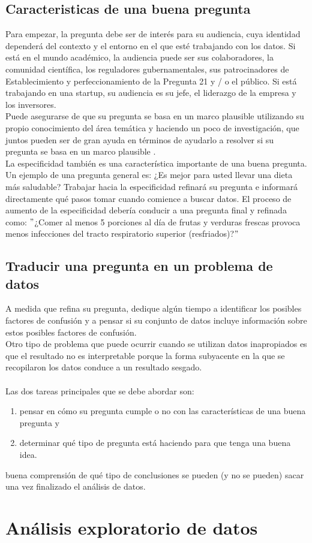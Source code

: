 \documentclass[10pt]{book}
\begin{document}
\section{Caracteristicas de una buena pregunta}
Para empezar, la pregunta debe ser de interés para su audiencia, cuya identidad dependerá del contexto y el entorno en el que esté trabajando con los datos. Si está en el mundo académico, la audiencia puede ser sus colaboradores, la comunidad científica, los reguladores gubernamentales, sus patrocinadores de Establecimiento y perfeccionamiento de la Pregunta 21 y / o el público. Si está trabajando en una startup, su audiencia es su jefe, el liderazgo de la empresa y los inversores.\\
Puede asegurarse de que su pregunta se basa en un marco plausible utilizando su propio conocimiento del área temática y haciendo un poco de investigación, que juntos pueden ser de gran ayuda en términos de ayudarlo a resolver si su pregunta se basa en un marco plausible .\\
La especificidad también es una característica importante de una buena pregunta. Un ejemplo de una pregunta general es: ¿Es mejor para usted llevar una dieta más saludable? Trabajar hacia la especificidad refinará su pregunta e informará directamente qué pasos tomar cuando comience a buscar datos. El proceso de aumento de la especificidad debería conducir a una pregunta final y refinada como: $"$¿Comer al menos 5 porciones al día de frutas y verduras frescas provoca menos infecciones del tracto respiratorio superior (resfriados)?$"$\\

\section{Traducir una pregunta en un problema de datos}
A medida que refina su pregunta, dedique algún tiempo a identificar los posibles factores de confusión y a pensar si su conjunto de datos incluye información sobre estos posibles factores de confusión.\\
Otro tipo de problema que puede ocurrir cuando se utilizan datos inapropiados es que el resultado no es interpretable porque la forma subyacente en la que se recopilaron los datos conduce a un resultado sesgado.\\\\
Las dos tareas principales que se debe abordar son: 
\begin{enumerate}[\bfseries 1.]
\item pensar en cómo su pregunta cumple o no con las características de una buena pregunta y 
\item determinar qué tipo de pregunta está haciendo para que tenga una buena idea. 
\end{enumerate}
buena comprensión de qué tipo de conclusiones se pueden (y no se pueden) sacar una vez finalizado el análisis de datos.\\



\chapter{Análisis exploratorio de datos}
\end{document}
